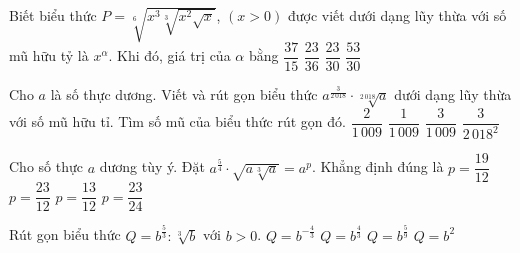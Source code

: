 \begin{ex}%
	Biết biểu thức $P=\sqrt[6]{x^{3}\sqrt[3]{x^2\sqrt{x}}}$, $(x>0)$ được viết dưới dạng lũy thừa với số mũ hữu tỷ là  $x^{\alpha}$. Khi đó, giá trị của $\alpha$ bằng
	 \choice
		{$\dfrac{37}{15}$} 
		 {\True $\dfrac{23}{36}$}
		{$\dfrac{23}{30}$} 
		 {$\dfrac{53}{30}$}
\end{ex}

\begin{ex}%
	Cho $a$ là số thực dương. Viết và rút gọn biểu thức $a^{\tfrac{3}{2\,018}}\cdot \sqrt[2\,018]{a}$ dưới dạng lũy thừa  với số mũ hữu tỉ. Tìm số mũ của biểu thức rút gọn đó.
	 \choice
		 {\True $\dfrac{2}{1\,009}$}
		 {$\dfrac{1}{1\,009}$}
		 {$\dfrac{3}{1\,009}$}
		 {$\dfrac{3}{2\,018^2}$}
\end{ex}

\begin{ex}%
	Cho số thực $a$ dương tùy ý. Đặt $a^{\tfrac{5}{4}}\cdot  \sqrt{a\sqrt[3]{a}}=a^p$. Khẳng định đúng là
	\choice 
		{$p=\dfrac{19}{12}$} 
		 {\True $p=\dfrac{23}{12}$}
		 {$p=\dfrac{13}{12}$}
		{$p=\dfrac{23}{24}$} 
\end{ex}

\begin{ex}%
	Rút gọn biểu thức $Q=b^{\tfrac{5}{3}}:\sqrt[3]{b}$ với  $b>0$.
	\choice 
		 {$Q=b^{-\tfrac{4}{3}}$}
		{\True $Q=b^{\tfrac{4}{3}}$} 
		 {$Q=b^{\tfrac{5}{9}}$}
		 {$Q=b^2$}
\end{ex}

